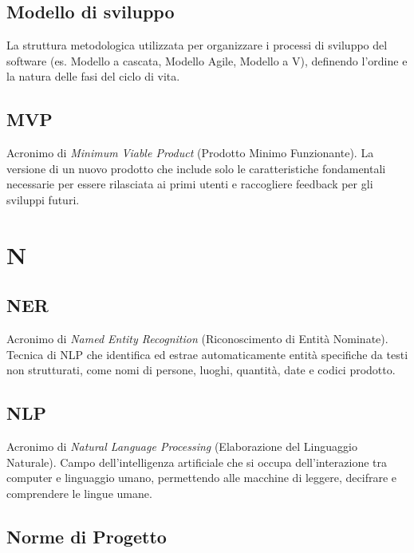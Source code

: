 \documentclass[a4paper, 11pt, oneside]{scrartcl} %
\begin{document}
\subsection*{Modello di sviluppo}
La struttura metodologica utilizzata per organizzare i processi di sviluppo del software (es. Modello a cascata, Modello Agile, Modello a V), definendo l'ordine e la natura delle fasi del ciclo di vita.
\vspace{0.5cm}

\subsection*{MVP}
Acronimo di \textit{Minimum Viable Product} (Prodotto Minimo Funzionante). La versione di un nuovo prodotto che include solo le caratteristiche fondamentali necessarie per essere rilasciata ai primi utenti e raccogliere feedback per gli sviluppi futuri.
\vspace{0.5cm}


\section*{N}


\subsection*{NER}
Acronimo di \textit{Named Entity Recognition} (Riconoscimento di Entità Nominate). Tecnica di NLP che identifica ed estrae automaticamente entità specifiche da testi non strutturati, come nomi di persone, luoghi, quantità, date e codici prodotto.
\vspace{0.5cm}

\subsection*{NLP}
Acronimo di \textit{Natural Language Processing} (Elaborazione del Linguaggio Naturale). Campo dell'intelligenza artificiale che si occupa dell'interazione tra computer e linguaggio umano, permettendo alle macchine di leggere, decifrare e comprendere le lingue umane.
\vspace{0.5cm}

\subsection*{Norme di Progetto}
\end{document}

